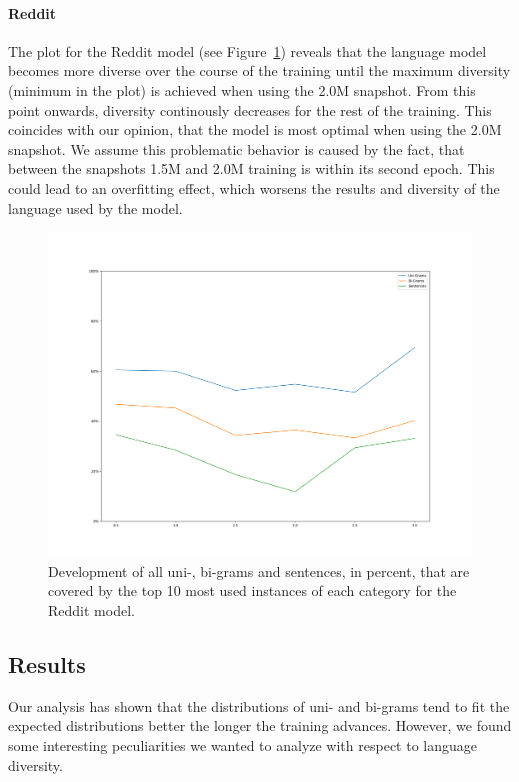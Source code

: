 \paragraph{Reddit} The plot for the Reddit model (see Figure~\ref{results:language_model:diversity:reddit}) reveals that the language model becomes more diverse over the course of the training until the maximum diversity (minimum in the plot) is achieved when using the 2.0M snapshot. From this point onwards, diversity continously decreases for the rest of the training. This coincides with our opinion, that the model is most optimal when using the 2.0M snapshot. We assume this problematic behavior is caused by the fact, that between the snapshots 1.5M and 2.0M training is within its second epoch. This could lead to an overfitting effect, which worsens the results and diversity of the language used by the model.

\begin{figure}[H]
	\includegraphics[width=\linewidth]{img/plots/reddit/diversity_perc_plot.png}
	\caption{Development of all uni-, bi-grams and sentences, in percent, that are covered by the top 10 most used instances of each category for the Reddit model.}
	\label{results:language_model:diversity:reddit}
\end{figure}

\subsection{Results}
Our analysis has shown that the distributions of uni- and bi-grams tend to fit the expected distributions better the longer the training advances. However, we found some interesting peculiarities we wanted to analyze with respect to language diversity.

